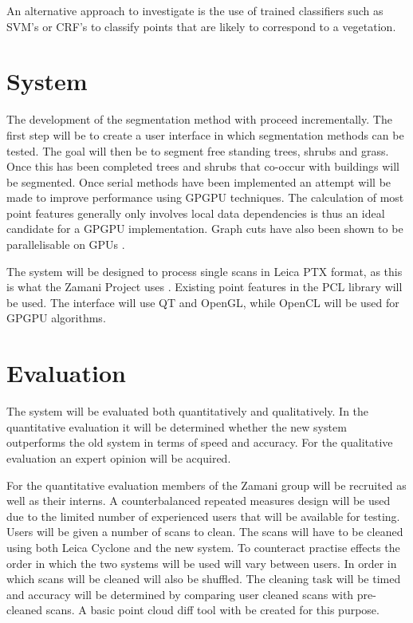 \documentclass[10pt,twocolumn]{article}
\begin{document}
An alternative approach to investigate is the use of trained classifiers such as SVM's or CRF's to classify points that are likely to correspond to a vegetation.


\section{System}

The development of the segmentation method with proceed incrementally. The first step will be to create a user interface in which segmentation methods can be tested. The goal will then be to segment free standing trees, shrubs and grass. Once this has been completed trees and shrubs that co-occur with buildings will be segmented. Once serial methods have been implemented an attempt will be made to improve performance using GPGPU techniques. The calculation of most point features generally only involves local data dependencies is thus an ideal candidate for a GPGPU implementation. Graph cuts have also been shown to be parallelisable on GPUs \cite{Hussein2007}.

The system will be designed to process single scans in Leica PTX format, as this is what the Zamani Project uses \cite{Held2012}. Existing point features in the PCL library \cite{Rusu2011} will be used. The interface will use QT and OpenGL, while OpenCL will be used for GPGPU algorithms.

\section{Evaluation}

The system will be evaluated both quantitatively and qualitatively. In the quantitative evaluation it will be determined whether the new system outperforms the old system in terms of speed and accuracy. For the qualitative evaluation an expert opinion will be acquired.

For the quantitative evaluation members of the Zamani group will be recruited as well as their interns. A counterbalanced repeated measures design will be used due to the limited number of experienced users that will be available for testing. Users will be given a number of scans to clean. The scans will have to be cleaned using both Leica Cyclone and the new system. To counteract practise effects the order in which the two systems will be used will vary between users. In order in which scans will be cleaned will also be shuffled. The cleaning task will be timed and accuracy will be determined by comparing user cleaned scans with pre-cleaned scans. A basic point cloud diff tool with be created for this purpose.
\end{document}
